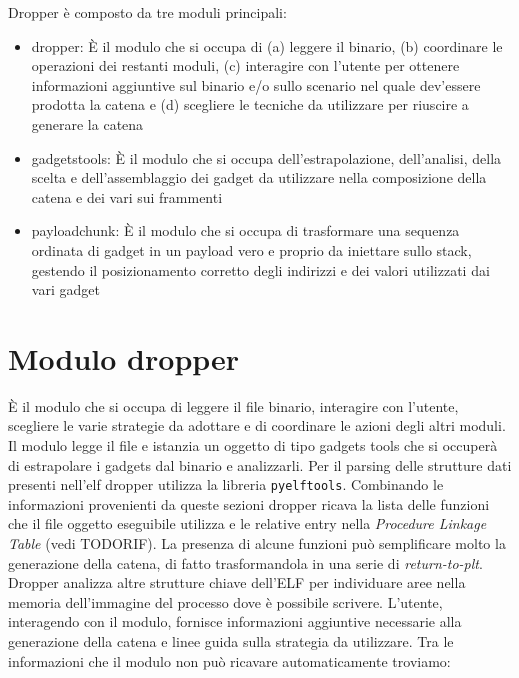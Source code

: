 Dropper è composto da tre moduli principali:

\begin{itemize}

  \item dropper: È il modulo che si occupa di (a) leggere il binario,
    (b) coordinare le operazioni dei restanti moduli, (c) interagire
    con l'utente per ottenere informazioni aggiuntive sul binario e/o
    sullo scenario nel quale dev'essere prodotta la catena e (d)
    scegliere le tecniche da utilizzare per riuscire a generare la
    catena

  \item gadgetstools: È il modulo che si occupa dell'estrapolazione,
    dell'analisi, della scelta e dell'assemblaggio dei gadget da utilizzare nella
    composizione della catena e dei vari sui frammenti

  \item payloadchunk: È il modulo che si occupa di trasformare una
    sequenza ordinata di gadget in un payload vero e proprio da
    iniettare sullo stack, gestendo il posizionamento corretto degli
    indirizzi e dei valori utilizzati dai vari gadget

\end{itemize}

\section{Modulo dropper}

È il modulo che si occupa di leggere il file binario, interagire con
l'utente, scegliere le varie strategie da adottare e di coordinare le
azioni degli altri moduli. Il modulo legge il file e istanzia un
oggetto di tipo gadgets tools che si occuperà di estrapolare i gadgets
dal binario e analizzarli. Per il parsing delle strutture dati
presenti nell'elf dropper utilizza la libreria
\lstinline{pyelftools}\cite{pyelftools}. Combinando le informazioni
provenienti da queste sezioni dropper ricava la lista delle funzioni
che il file oggetto eseguibile utilizza e le relative entry nella
\emph{Procedure Linkage Table} (vedi TODORIF). La presenza di alcune
funzioni può semplificare molto la generazione della catena, di fatto
trasformandola in una serie di \emph{return-to-plt}. Dropper analizza
altre strutture chiave dell'ELF per individuare aree nella memoria
dell'immagine del processo dove è possibile scrivere. L'utente,
interagendo con il modulo, fornisce informazioni aggiuntive necessarie
alla generazione della catena e linee guida sulla strategia da
utilizzare. Tra le informazioni che il modulo non può ricavare
automaticamente troviamo:


